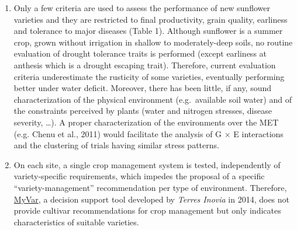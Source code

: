 \documentclass[a4paper]{article}
\begin{document}
\begin{enumerate}
\item
  Only a few criteria are used to assess the performance of new
  sunflower varieties and they are restricted to final productivity,
  grain quality, earliness and tolerance to major diseases (Table 1).
  Although sunflower is a summer crop, grown without irrigation in
  shallow to moderately-deep soils, no routine evaluation of drought
  tolerance traits is performed (except earliness at anthesis which is a
  drought escaping trait). Therefore, current evaluation criteria
  underestimate the rusticity of some varieties, eventually performing
  better under water deficit. Moreover, there has been little, if any,
  sound characterization of the physical environment (e.g.~available
  soil water) and of the constraints perceived by plants (water and
  nitrogen stresses, disease severity, \ldots{}). A proper
  characterization of the environments over the MET (e.g. Chenu et al.,
  2011) would facilitate the analysis of G \(\times\) E interactions and
  the clustering of trials having similar stress patterns.
\item
  On each site, a single crop management system is tested, independently
  of variety-specific requirements, which impedes the proposal of a
  specific ``variety-management'' recommendation per type of
  environment. Therefore, \href{http://www.myvar.fr/}{MyVar}, a decision
  support tool developed by \emph{Terres Inovia} in 2014, does not
  provide cultivar recommendations for crop management but only
  indicates characteristics of suitable varieties.
\end{enumerate}
\end{document}
